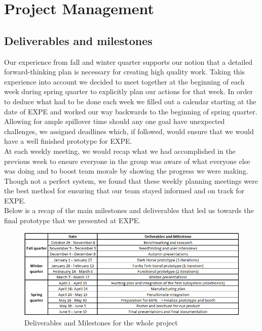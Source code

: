 \chapter{Project Management}
\label{Project_Management}

\section{Deliverables and milestones}

Our experience from fall and winter quarter supports our notion that a detailed forward-thinking plan is necessary for creating high quality work. Taking this experience into account we decided to meet together at the beginning of each week during spring quarter to explicitly plan our actions for that week. In order to deduce what had to be done each week we filled out a calendar starting at the date of EXPE and worked our way backwards to the beginning of spring quarter. Allowing for ample spillover time should any one goal have unexpected challenges, we assigned deadlines which, if followed, would ensure that we would have a well finished prototype for EXPE.\\
At each weekly meeting, we would recap what we had accomplished in the previous week to ensure everyone in the group was aware of what everyone else was doing and to boost team morale by showing the progress we were making. Though not a perfect system, we found that these weekly planning meetings were the best method for ensuring that our team stayed informed and on track for EXPE.\\
Below is a recap of the main milestones and deliverables that led us towards the final prototype that we presented at EXPE. 

\begin{figure}[h]
  \centering
     \includegraphics[scale=0.8]{images/planning.png}
   \caption{Deliverables and Milestones for the whole project}
  \label{fig:planning}
\end{figure}


